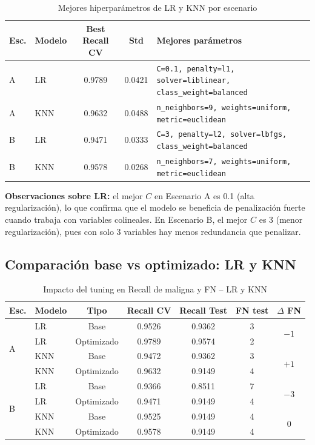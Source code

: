 \documentclass[11pt,a4paper]{article}
\begin{document}
\begin{table}[H]
\centering
\caption{Mejores hiperparámetros de LR y KNN por escenario}
\renewcommand{\arraystretch}{1.2}
\begin{tabularx}{\textwidth}{l l c c X}
\toprule
\textbf{Esc.} & \textbf{Modelo} & \textbf{Best Recall CV} & \textbf{Std} & \textbf{Mejores parámetros} \\
\midrule
A & LR & 0.9789 & 0.0421 & \texttt{C=0.1, penalty=l1, solver=liblinear, class\_weight=balanced} \\
A & KNN & 0.9632 & 0.0488 & \texttt{n\_neighbors=9, weights=uniform, metric=euclidean} \\
\midrule
B & LR & 0.9471 & 0.0333 & \texttt{C=3, penalty=l2, solver=lbfgs, class\_weight=balanced} \\
B & KNN & 0.9578 & 0.0268 & \texttt{n\_neighbors=7, weights=uniform, metric=euclidean} \\
\bottomrule
\end{tabularx}
\end{table}

\textbf{Observaciones sobre LR:} el mejor $C$ en Escenario A es 0.1 (alta regularización), lo que confirma que el modelo se beneficia de penalización fuerte cuando trabaja con variables colineales. En Escenario B, el mejor $C$ es 3 (menor regularización), pues con solo 3 variables hay menos redundancia que penalizar.

\subsection{Comparación base vs optimizado: LR y KNN}

\begin{table}[H]
\centering
\caption{Impacto del tuning en Recall de maligna y FN -- LR y KNN}
\renewcommand{\arraystretch}{1.15}
\begin{tabular}{llccccc}
\toprule
\textbf{Esc.} & \textbf{Modelo} & \textbf{Tipo} & \textbf{Recall CV} & \textbf{Recall Test} & \textbf{FN test} & \textbf{$\Delta$ FN} \\
\midrule
\multirow{4}{*}{A}
 & LR & Base & 0.9526 & 0.9362 & 3 & \multirow{2}{*}{$-1$} \\
 & \rowcolor{bestrow}LR & Optimizado & 0.9789 & 0.9574 & 2 & \\
 & KNN & Base & 0.9472 & 0.9362 & 3 & \multirow{2}{*}{$+1$} \\
 & \rowcolor{warnrow}KNN & Optimizado & 0.9632 & 0.9149 & 4 & \\
\midrule
\multirow{4}{*}{B}
 & LR & Base & 0.9366 & 0.8511 & 7 & \multirow{2}{*}{$-3$} \\
 & \rowcolor{bestrow}LR & Optimizado & 0.9471 & 0.9149 & 4 & \\
 & KNN & Base & 0.9525 & 0.9149 & 4 & \multirow{2}{*}{$0$} \\
 & KNN & Optimizado & 0.9578 & 0.9149 & 4 & \\
\bottomrule
\end{tabular}
\end{table}
\end{document}
